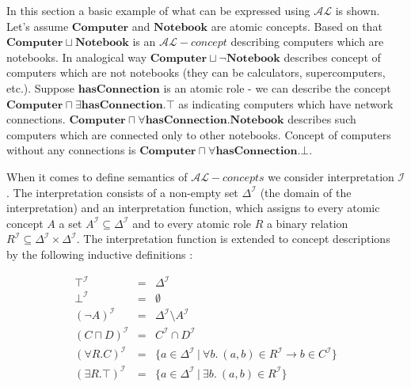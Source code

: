 \smallskip

In this section a basic example of what can be expressed using $\mathcal{AL}$ is shown. Let's assume $\mathbf{Computer}$ and $\mathbf{Notebook}$ are atomic concepts. Based on that $\mathbf{Computer} \sqcup \mathbf{Notebook}$ is an $\mathcal{AL}-concept$ describing computers which are notebooks. In analogical way $\mathbf{Computer} \sqcup \lnot\mathbf{Notebook}$ describes concept of computers which are not notebooks (they can be calculators, supercomputers, etc.). Suppose $\mathbf{hasConnection}$ is an atomic role - we can describe the concept $\mathbf{Computer} \sqcap \exists\mathbf{hasConnection}.\top$ as indicating computers which have network connections. $\mathbf{Computer} \sqcap \forall\mathbf{hasConnection}.\mathbf{Notebook}$ describes such computers which are connected only to other notebooks. Concept of computers without any connections is $\mathbf{Computer} \sqcap \forall\mathbf{hasConnection}.\bot$.

When it comes to define semantics of $\mathcal{AL}-concepts$ we consider interpretation $\mathcal{I}$. The interpretation consists of a non-empty set $\Delta^{\mathcal{I}}$ (the domain of the interpretation) and an interpretation function, which assigns to every atomic concept $A$ a set $A^{\mathcal{I}} \subseteq \Delta^{\mathcal{I}}$ and to every atomic role $R$ a binary relation $R^{\mathcal{I}} \subseteq \Delta^{\mathcal{I}} \times \Delta^{\mathcal{I}}$. The interpretation function is extended to concept descriptions by the following inductive definitions \cite{BCM03}:

\newpage

\[
\begin{array}{rcl}
    \top^{\mathcal{I}}              & = & \Delta^{\mathcal{I}} \\
    \bot^{\mathcal{I}}              & = & \emptyset \\
    (\lnot A)^{\mathcal{I}}         & = & \Delta^{\mathcal{I}}\setminus A^{\mathcal{I}} \\
    (C\sqcap D)^{\mathcal{I}}       & = & C^{\mathcal{I}}\cap D^{\mathcal{I}} \\
    (\forall R.C)^{\mathcal{I}}     & = & \{a \in \Delta^{\mathcal{I}}~|~\forall b.~(a,b) \in R^{\mathcal{I}} \to b \in C^{\mathcal{I}}\} \\
    (\exists R.\top)^{\mathcal{I}}  & = & \{a \in \Delta^{\mathcal{I}}~|~\exists b.~(a,b) \in R^{\mathcal{I}}\}
\end{array}
\]

\smallskip

